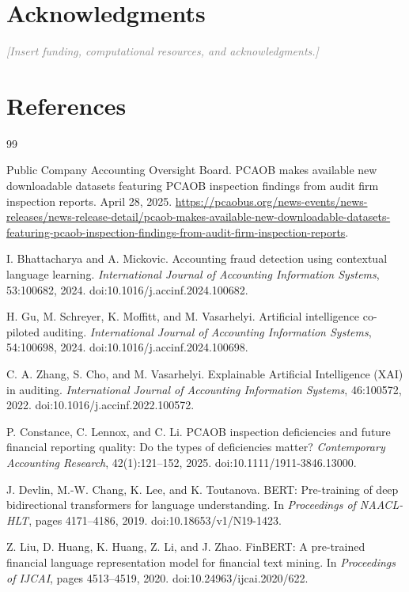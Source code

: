 \documentclass[11pt]{article}
\newcommand{\placeholder}[1]{\textcolor{gray}{\emph{[#1]}}}
\begin{document}
\section*{Acknowledgments}

\placeholder{Insert funding, computational resources, and acknowledgments.}

\section*{References}

\begin{thebibliography}{99}

Public Company Accounting Oversight Board.
PCAOB makes available new downloadable datasets featuring PCAOB inspection
findings from audit firm inspection reports. April 28, 2025.
\url{https://pcaobus.org/news-events/news-releases/news-release-detail/pcaob-makes-available-new-downloadable-datasets-featuring-pcaob-inspection-findings-from-audit-firm-inspection-reports}.

I. Bhattacharya and A. Mickovic.
Accounting fraud detection using contextual language learning.
\emph{International Journal of Accounting Information Systems}, 53:100682,
2024. doi:10.1016/j.accinf.2024.100682.

H. Gu, M. Schreyer, K. Moffitt, and M. Vasarhelyi.
Artificial intelligence co-piloted auditing.
\emph{International Journal of Accounting Information Systems}, 54:100698,
2024. doi:10.1016/j.accinf.2024.100698.

C. A. Zhang, S. Cho, and M. Vasarhelyi.
Explainable Artificial Intelligence (XAI) in auditing.
\emph{International Journal of Accounting Information Systems}, 46:100572,
2022. doi:10.1016/j.accinf.2022.100572.

P. Constance, C. Lennox, and C. Li.
PCAOB inspection deficiencies and future financial reporting quality: Do the
types of deficiencies matter?
\emph{Contemporary Accounting Research}, 42(1):121--152, 2025.
doi:10.1111/1911-3846.13000.

J. Devlin, M.-W. Chang, K. Lee, and K. Toutanova.
BERT: Pre-training of deep bidirectional transformers for language
understanding. In \emph{Proceedings of NAACL-HLT}, pages 4171--4186, 2019.
doi:10.18653/v1/N19-1423.

Z. Liu, D. Huang, K. Huang, Z. Li, and J. Zhao.
FinBERT: A pre-trained financial language representation model for financial
text mining. In \emph{Proceedings of IJCAI}, pages 4513--4519, 2020.
doi:10.24963/ijcai.2020/622.


\end{thebibliography}
\end{document}
